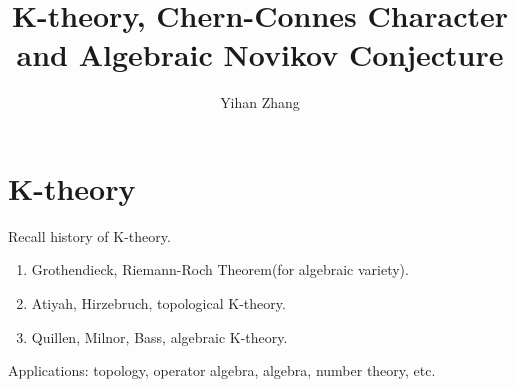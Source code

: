 \documentclass[12pt]{article}
\begin{document}
\title{K-theory, Chern-Connes Character and Algebraic Novikov Conjecture}
\author{Yihan Zhang}
\maketitle

\tableofcontents
\bigskip

\section{K-theory}
Recall history of K-theory.
\begin{enumerate}
	\item Grothendieck, Riemann-Roch Theorem(for algebraic variety).
	\item Atiyah, Hirzebruch, topological K-theory.
	\item Quillen, Milnor, Bass, algebraic K-theory.
\end{enumerate}
Applications: topology, operator algebra, algebra, number theory, etc.
\end{document}
